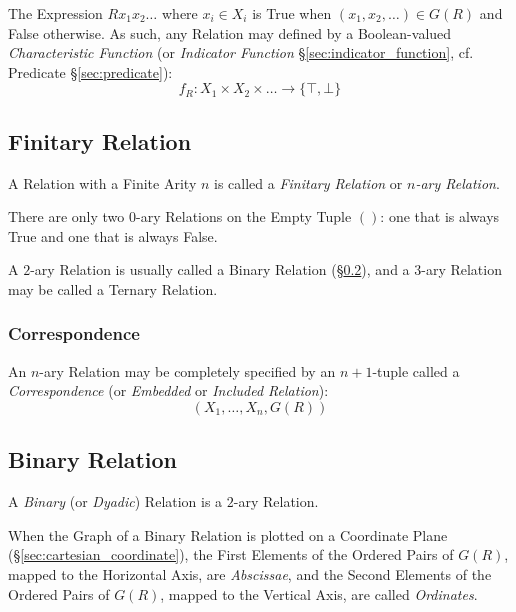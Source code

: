 The Expression $R x_1 x_2 \ldots$ where $x_i \in X_i$ is True when
$(x_1, x_2, \ldots) \in G(R)$ and False otherwise. As such, any
Relation may defined by a Boolean-valued \emph{Characteristic
  Function} (or \emph{Indicator Function}
\S\ref{sec:indicator_function}, cf. Predicate \S\ref{sec:predicate}):
\[
  f_R : X_1 \times X_2 \times \ldots \rightarrow \{\top,\bot\}
\]


\subsection{Finitary Relation}\label{sec:finitary_relation}

A Relation with a Finite Arity $n$ is called a \emph{Finitary
  Relation} or \emph{$n$-ary Relation}.

There are only two $0$-ary Relations on the Empty Tuple $()$: one that
is always True and one that is always False.

A $2$-ary Relation is usually called a Binary Relation
(\S\ref{sec:binary_relation}), and a $3$-ary Relation may be called a
Ternary Relation.



\subsubsection{Correspondence}\label{sec:correspondence}

An $n$-ary Relation may be completely specified by an $n + 1$-tuple
called a \emph{Correspondence} (or \emph{Embedded} or \emph{Included
  Relation}):
\[
  (X_1, \ldots, X_n, G(R))
\]



\subsection{Binary Relation}\label{sec:binary_relation}

A \emph{Binary} (or \emph{Dyadic}) Relation is a $2$-ary Relation.

When the Graph of a Binary Relation is plotted on a Coordinate Plane
(\S\ref{sec:cartesian_coordinate}), the First Elements of the Ordered
Pairs of $G(R)$, mapped to the Horizontal Axis, are \emph{Abscissae},
and the Second Elements of the Ordered Pairs of $G(R)$, mapped to the
Vertical Axis, are called \emph{Ordinates}.

